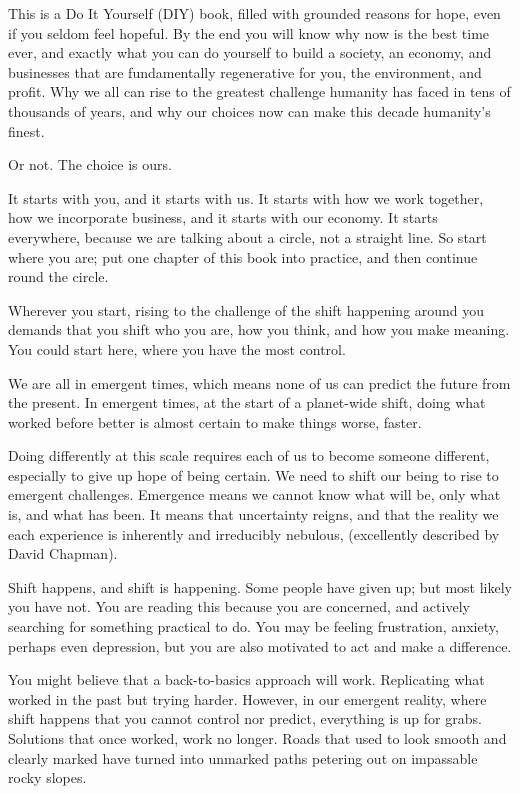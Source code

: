 This is a Do It Yourself (DIY) book, filled with grounded reasons for hope, even if you seldom feel hopeful. By the end you will know why now is the best time ever, and exactly what you can do yourself to build a society, an economy, and businesses that are fundamentally regenerative for you, the environment, and profit. Why we all can rise to the greatest challenge humanity has faced in tens of thousands of years, and why our choices now can make this decade humanity's finest. 


Or not. The choice is ours.


It starts with you, and it starts with us. It starts with how we work together, how we incorporate business, and it starts with our economy. It starts everywhere, because we are talking about a circle, not a straight line. So start where you are; put one chapter of this book into practice, and then continue round the circle. 


Wherever you start, rising to the challenge of the shift happening around you demands that you shift who you are, how you think, and how you make meaning. You could start here, where you have the most control.


We are all in emergent times, which means none of us can predict the future from the present. In emergent times, at the start of a planet-wide shift, doing what worked before better is almost certain to make things worse, faster.


Doing differently at this scale requires each of us to become someone different, especially to give up hope of being certain. We need to shift our being to rise to emergent challenges. Emergence means we cannot know what will be, only what is, and what has been. It means that uncertainty reigns, and that the reality we each experience is inherently and irreducibly nebulous, (excellently described by David Chapman\cite{chapman-meaningness-nebulosity}). 


Shift happens, and shift is happening. Some people have given up; but most likely you have not. You are reading this because you are concerned, and actively searching for something practical to do. You may be feeling frustration, anxiety, perhaps even depression, but you are also motivated to act and make a difference.


You might believe that a back-to-basics approach will work. Replicating what worked in the past but trying harder. However, in our emergent reality, where shift happens that you cannot control nor predict, everything is up for grabs. Solutions that once worked, work no longer. Roads that used to look smooth and clearly marked have turned into unmarked paths petering out on impassable rocky slopes.


